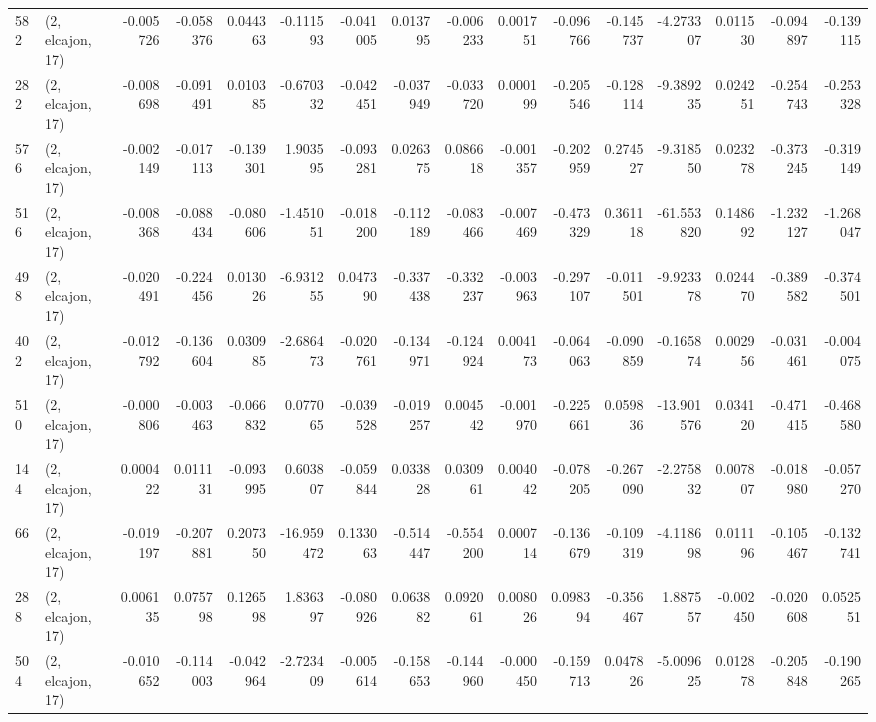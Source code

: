 \begin{tabular}{llrrrrrrrrrrrrrr}
582 &  (2, elcajon, 17) &  -0.005726 & -0.058376 &  0.044363 &   -0.111593 & -0.041005 &   0.013795 & -0.006233 &  0.001751 & -0.096766 & -0.145737 &   -4.273307 &  0.011530 & -0.094897 & -0.139115 \\
282 &  (2, elcajon, 17) &  -0.008698 & -0.091491 &  0.010385 &   -0.670332 & -0.042451 &  -0.037949 & -0.033720 &  0.000199 & -0.205546 & -0.128114 &   -9.389235 &  0.024251 & -0.254743 & -0.253328 \\
576 &  (2, elcajon, 17) &  -0.002149 & -0.017113 & -0.139301 &    1.903595 & -0.093281 &   0.026375 &  0.086618 & -0.001357 & -0.202959 &  0.274527 &   -9.318550 &  0.023278 & -0.373245 & -0.319149 \\
516 &  (2, elcajon, 17) &  -0.008368 & -0.088434 & -0.080606 &   -1.451051 & -0.018200 &  -0.112189 & -0.083466 & -0.007469 & -0.473329 &  0.361118 &  -61.553820 &  0.148692 & -1.232127 & -1.268047 \\
498 &  (2, elcajon, 17) &  -0.020491 & -0.224456 &  0.013026 &   -6.931255 &  0.047390 &  -0.337438 & -0.332237 & -0.003963 & -0.297107 & -0.011501 &   -9.923378 &  0.024470 & -0.389582 & -0.374501 \\
402 &  (2, elcajon, 17) &  -0.012792 & -0.136604 &  0.030985 &   -2.686473 & -0.020761 &  -0.134971 & -0.124924 &  0.004173 & -0.064063 & -0.090859 &   -0.165874 &  0.002956 & -0.031461 & -0.004075 \\
510 &  (2, elcajon, 17) &  -0.000806 & -0.003463 & -0.066832 &    0.077065 & -0.039528 &  -0.019257 &  0.004542 & -0.001970 & -0.225661 &  0.059836 &  -13.901576 &  0.034120 & -0.471415 & -0.468580 \\
144 &  (2, elcajon, 17) &   0.000422 &  0.011131 & -0.093995 &    0.603807 & -0.059844 &   0.033828 &  0.030961 &  0.004042 & -0.078205 & -0.267090 &   -2.275832 &  0.007807 & -0.018980 & -0.057270 \\
66  &  (2, elcajon, 17) &  -0.019197 & -0.207881 &  0.207350 &  -16.959472 &  0.133063 &  -0.514447 & -0.554200 &  0.000714 & -0.136679 & -0.109319 &   -4.118698 &  0.011196 & -0.105467 & -0.132741 \\
288 &  (2, elcajon, 17) &   0.006135 &  0.075798 &  0.126598 &    1.836397 & -0.080926 &   0.063882 &  0.092061 &  0.008026 &  0.098394 & -0.356467 &    1.887557 & -0.002450 & -0.020608 &  0.052551 \\
504 &  (2, elcajon, 17) &  -0.010652 & -0.114003 & -0.042964 &   -2.723409 & -0.005614 &  -0.158653 & -0.144960 & -0.000450 & -0.159713 &  0.047826 &   -5.009625 &  0.012878 & -0.205848 & -0.190265 \\

\end{tabular}
